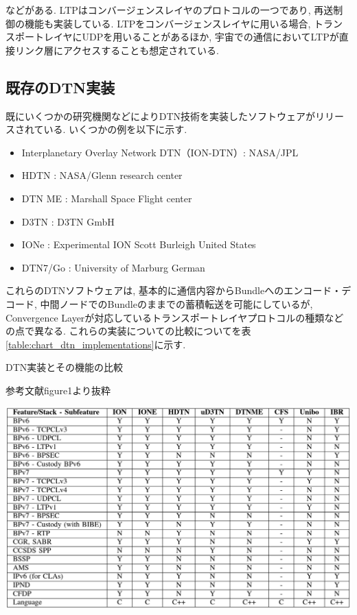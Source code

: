 などがある. 
LTP\cite{rfc5326}はコンバージェンスレイヤのプロトコルの一つであり,  再送制御の機能も実装している. 
LTPをコンバージェンスレイヤに用いる場合,  トランスポートレイヤにUDPを用いることがあるほか,  
宇宙での通信においてLTPが直接リンク層にアクセスすることも想定されている. 

\subsection{既存のDTN実装}
\label{section:既存のDTN実装}
既にいくつかの研究機関などによりDTN技術を実装したソフトウェアがリリースされている.  いくつかの例を以下に示す.  
\begin{itemize}
    \item Interplanetary Overlay Network DTN（ION-DTN）: NASA/JPL
    \item HDTN : NASA/Glenn research center
    \item DTN ME : Marshall Space Flight center
    \item \textmu D3TN : D3TN GmbH
    \item IONe : Experimental ION Scott Burleigh United States 
    \item DTN7/Go : University of Marburg German
\end{itemize}
これらのDTNソフトウェアは,  基本的に通信内容からBundleへのエンコード・デコード,  
中間ノードでのBundleのままでの蓄積転送を可能にしているが,  
Convergence Layerが対応しているトランスポートレイヤプロトコルの種類などの点で異なる. 
これらの実装についての比較についてを表\ref{table:chart_dtn_implementations}に示す. 

\begin{table}[tbh]
    \centering
    \caption{DTN実装とその機能の比較}
    \begin{minipage}[t]{\textwidth}
        \centering
        \fontsize{10.5pt}{12pt}\selectfont
        参考文献\cite{dtn_implementations}figure1より抜粋
        \vspace{3mm}
    \end{minipage}
    \includegraphics[width=0.7\textheight]{img/chart_dtn_implementations.pdf}
    \label{table:chart_dtn_implementations}
\end{table}